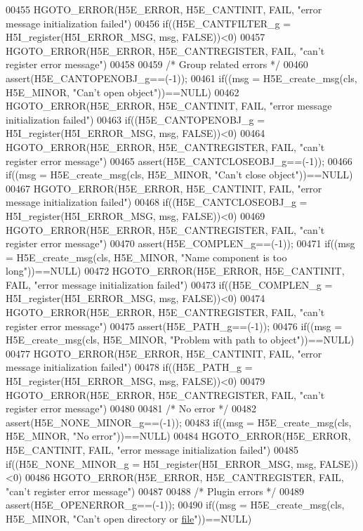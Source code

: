 \begin{DoxyCode}
00455     HGOTO\_ERROR(H5E\_ERROR, H5E\_CANTINIT, FAIL, "error message initialization failed")
00456 if((H5E\_CANTFILTER\_g = H5I\_register(H5I\_ERROR\_MSG, msg, FALSE))<0)
00457     HGOTO\_ERROR(H5E\_ERROR, H5E\_CANTREGISTER, FAIL, "can't register error message")
00458 
00459 \textcolor{comment}{/* Group related errors */}
00460 assert(H5E\_CANTOPENOBJ\_g==(-1));
00461 if((msg = H5E\_create\_msg(cls, H5E\_MINOR, "Can't open \textcolor{keywordtype}{object}"))==NULL)
00462     HGOTO\_ERROR(H5E\_ERROR, H5E\_CANTINIT, FAIL, "error message initialization failed")
00463 if((H5E\_CANTOPENOBJ\_g = H5I\_register(H5I\_ERROR\_MSG, msg, FALSE))<0)
00464     HGOTO\_ERROR(H5E\_ERROR, H5E\_CANTREGISTER, FAIL, "can't register error message")
00465 assert(H5E\_CANTCLOSEOBJ\_g==(-1));
00466 if((msg = H5E\_create\_msg(cls, H5E\_MINOR, "Can't close \textcolor{keywordtype}{object}"))==NULL)
00467     HGOTO\_ERROR(H5E\_ERROR, H5E\_CANTINIT, FAIL, "error message initialization failed")
00468 if((H5E\_CANTCLOSEOBJ\_g = H5I\_register(H5I\_ERROR\_MSG, msg, FALSE))<0)
00469     HGOTO\_ERROR(H5E\_ERROR, H5E\_CANTREGISTER, FAIL, "can't register error message")
00470 assert(H5E\_COMPLEN\_g==(-1));
00471 if((msg = H5E\_create\_msg(cls, H5E\_MINOR, "Name component is too \textcolor{keywordtype}{long}"))==NULL)
00472     HGOTO\_ERROR(H5E\_ERROR, H5E\_CANTINIT, FAIL, "error message initialization failed")
00473 if((H5E\_COMPLEN\_g = H5I\_register(H5I\_ERROR\_MSG, msg, FALSE))<0)
00474     HGOTO\_ERROR(H5E\_ERROR, H5E\_CANTREGISTER, FAIL, "can't register error message")
00475 assert(H5E\_PATH\_g==(-1));
00476 if((msg = H5E\_create\_msg(cls, H5E\_MINOR, "Problem with path to \textcolor{keywordtype}{object}"))==NULL)
00477     HGOTO\_ERROR(H5E\_ERROR, H5E\_CANTINIT, FAIL, "error message initialization failed")
00478 if((H5E\_PATH\_g = H5I\_register(H5I\_ERROR\_MSG, msg, FALSE))<0)
00479     HGOTO\_ERROR(H5E\_ERROR, H5E\_CANTREGISTER, FAIL, "can't register error message")
00480 
00481 \textcolor{comment}{/* No error */}
00482 assert(H5E\_NONE\_MINOR\_g==(-1));
00483 if((msg = H5E\_create\_msg(cls, H5E\_MINOR, "No error"))==NULL)
00484     HGOTO\_ERROR(H5E\_ERROR, H5E\_CANTINIT, FAIL, "error message initialization failed")
00485 if((H5E\_NONE\_MINOR\_g = H5I\_register(H5I\_ERROR\_MSG, msg, FALSE))<0)
00486     HGOTO\_ERROR(H5E\_ERROR, H5E\_CANTREGISTER, FAIL, "can't register error message")
00487 
00488 \textcolor{comment}{/* Plugin errors */}
00489 assert(H5E\_OPENERROR\_g==(-1));
00490 if((msg = H5E\_create\_msg(cls, H5E\_MINOR, "Can't open directory or \hyperlink{structfile}{file}"))==NULL)

\end{DoxyCode}
